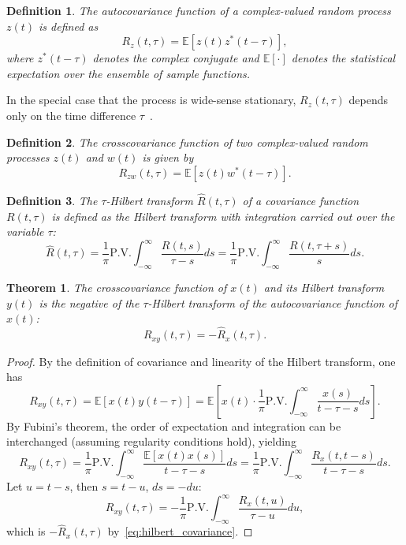 \documentclass[12pt]{article}
\newtheorem{theorem}{Theorem}[section]
\newtheorem{definition}{Definition}[section]
\begin{document}
\begin{definition}
\label{def:autocovariance}
The \emph{autocovariance function} of a complex-valued random process $z(t)$ is defined as
\begin{equation}
R_z(t,\tau) = \mathbb{E}[z(t)z^*(t-\tau)],
\label{eq:autocovariance}
\end{equation}
where $z^*(t-\tau)$ denotes the complex conjugate and $\mathbb{E}[\cdot]$ denotes the statistical expectation over the ensemble of sample functions.
\end{definition}

In the special case that the process is wide-sense stationary, $R_z(t,\tau)$ depends only on the time difference $\tau$~\cite{doob1953}.

\begin{definition}
\label{def:crosscovariance}
The \emph{crosscovariance function} of two complex-valued random processes $z(t)$ and $w(t)$ is given by
\begin{equation}
R_{zw}(t, \tau) = \mathbb{E}[z(t)w^*(t-\tau)].
\label{eq:crosscovariance}
\end{equation}
\end{definition}

\begin{definition}
\label{def:hilbert_covariance}
The $\tau$-Hilbert transform $\hat{R}(t,\tau)$ of a covariance function $R(t,\tau)$ is defined as the Hilbert transform with integration carried out over the variable $\tau$:
\begin{equation}
\hat{R}(t,\tau) = \frac{1}{\pi} \mathrm{P.V.} \int_{-\infty}^{\infty} \frac{R(t,s)}{\tau-s} ds = \frac{1}{\pi} \mathrm{P.V.} \int_{-\infty}^{\infty} \frac{R(t,\tau+s)}{s} ds.
\label{eq:hilbert_covariance}
\end{equation}
\end{definition}

\begin{theorem}
\label{thm:crosscov_hilbert}
The crosscovariance function of $x(t)$ and its Hilbert transform $y(t)$ is the negative of the $\tau$-Hilbert transform of the autocovariance function of $x(t)$:
\begin{equation}
R_{xy}(t, \tau) = -\hat{R}_x(t, \tau).
\label{eq:crosscov_hilbert}
\end{equation}
\end{theorem}
\begin{proof}
By the definition of covariance and linearity of the Hilbert transform, one has
\[
R_{xy}(t,\tau) = \mathbb{E}[x(t)y(t-\tau)] = \mathbb{E}\left[ x(t) \cdot \frac{1}{\pi} \mathrm{P.V.} \int_{-\infty}^\infty \frac{x(s)}{t-\tau-s} ds \right] .
\]
By Fubini's theorem, the order of expectation and integration can be interchanged (assuming regularity conditions hold), yielding
\[
R_{xy}(t,\tau) = \frac{1}{\pi} \mathrm{P.V.} \int_{-\infty}^\infty \frac{\mathbb{E}[x(t)x(s)]}{t-\tau-s} ds = \frac{1}{\pi} \mathrm{P.V.} \int_{-\infty}^\infty \frac{R_x(t, t-s)}{t-\tau-s} ds.
\]
Let $u = t-s$, then $s = t-u$, $ds = -du$:
\[
R_{xy}(t,\tau) = -\frac{1}{\pi} \mathrm{P.V.} \int_{-\infty}^\infty \frac{R_x(t, u)}{\tau - u} du,
\]
which is $- \hat{R}_x(t, \tau)$ by~\eqref{eq:hilbert_covariance}.
\end{proof}
\end{document}
